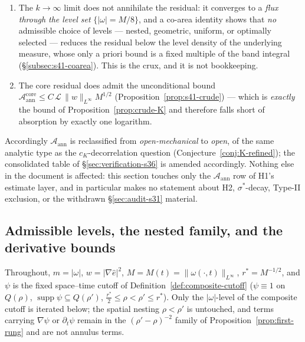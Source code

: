 \documentclass[11pt]{article}
\theoremstyle{definition}
\theoremstyle{remark}
\begin{document}
\begin{enumerate}[label=(\alph*)]
    needs a superlinear gain running from coarse levels to fine ones. Here
    the recursion runs the \emph{opposite} way --- the level sets
    \emph{grow} with $k$ --- and is homogeneous of degree one
    (Remark~\ref{rem:s41-whichlemma}).
  \item The $k\to\infty$ limit does not annihilate the residual: it
    converges to a \emph{flux through the level set} $\{|\omega|=M/8\}$, and
    a co-area identity shows that \emph{no} admissible choice of levels ---
    nested, geometric, uniform, or optimally selected --- reduces the
    residual below the level density of the underlying measure, whose only
    a priori bound is a fixed multiple of the band integral
    (\S\ref{subsec:s41-coarea}). This is the crux, and it is not
    bookkeeping.
  \item The core residual does admit the unconditional bound
    $\mathcal{A}_{\mathrm{ann}}^{\mathrm{core}}
    \leq C\,\mathcal{L}\,\|w\|_{L^\infty}M^{1/2}$
    (Proposition~\ref{prop:s41-crude}) --- which is \emph{exactly} the bound
    of Proposition~\ref{prop:crude-K} and therefore falls short of
    absorption by exactly one logarithm.
\end{enumerate}

\noindent Accordingly $\mathcal{A}_{\mathrm{ann}}$ is reclassified from
\emph{open-mechanical} to \emph{open}, of the same analytic type as the
$c_K$-decorrelation question (Conjecture~\ref{conj:K-refined}); the
consolidated table of \S\ref{sec:verification-s36} is amended accordingly.
Nothing else in the document is affected: this section touches only the
$\mathcal{A}_{\mathrm{ann}}$ row of H1's estimate layer, and in particular
makes no statement about H2, $\sigma^*$-decay, Type-II exclusion, or the
withdrawn \S\ref{sec:audit-s31} material.

\subsection{Admissible levels, the nested family, and the derivative bounds}
\label{subsec:s41-setup}

Throughout, $m=|\omega|$, $w=|\nabla\hat{e}|^2$,
$M=M(t)=\|\omega(\cdot,t)\|_{L^\infty}$, $r^*=M^{-1/2}$, and $\psi$ is the
fixed space--time cutoff of Definition~\ref{def:composite-cutoff}
($\psi\equiv1$ on $Q(\rho)$, $\operatorname{supp}\psi\subseteq Q(\rho')$,
$\tfrac{r^*}{2}\leq\rho<\rho'\leq r^*$). Only the $|\omega|$-level of the
composite cutoff is iterated below; the spatial nesting $\rho<\rho'$ is
untouched, and terms carrying $\nabla\psi$ or $\partial_t\psi$ remain in the
$(\rho'-\rho)^{-2}$ family of Proposition~\ref{prop:first-rung} and are not
annulus terms.
\end{document}
